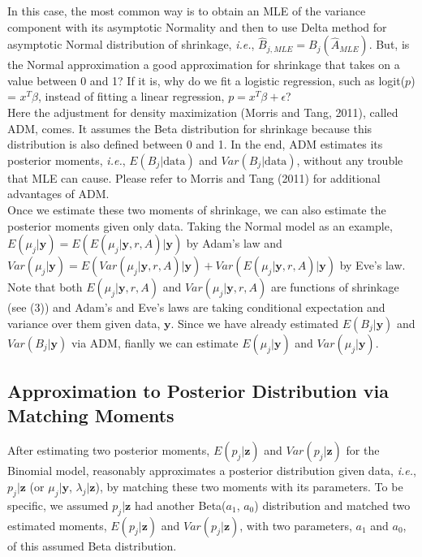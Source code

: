 \documentclass[article]{jss}
\begin{document}
In this case, the most common way is to obtain an MLE of the variance component with its asymptotic Normality and then to use Delta method for asymptotic Normal distribution of shrinkage, \emph{i.e.}, $\hat{B}_{j, MLE}=B_{j}(\hat{A}_{MLE})$. But, is the Normal approximation a good approximation for shrinkage that takes on a value between 0 and 1? If it is, why do we fit a logistic regression, such as logit($p$) = $x^{T}\beta$, instead of fitting a linear regression, $p = x^{T}\beta+\epsilon$?
\\

Here the adjustment for density maximization (Morris and Tang, 2011), called ADM, comes. It assumes the Beta distribution for shrinkage because this distribution is also defined between 0 and 1. In the end, ADM  estimates its posterior moments, \emph{i.e.}, $E(B_{j}\vert\textrm{data})$ and $Var(B_{j}\vert\textrm{data})$, without any trouble that MLE can cause. Please refer to Morris and Tang (2011) for additional advantages of ADM.
\\

Once we estimate these two moments of shrinkage, we can also estimate the posterior moments given only data. Taking the Normal model as an example,  $E(\mu_{j}\vert \textbf{y})=E(E(\mu_{j}\vert \textbf{y}, r, A)\vert \textbf{y})$ by Adam's law and $Var(\mu_{j}\vert \textbf{y})=E(Var(\mu_{j}\vert \textbf{y}, r, A)\vert \textbf{y})+Var(E(\mu_{j}\vert \textbf{y}, r, A)\vert \textbf{y})$ by Eve's law. Note that both $E(\mu_{j}\vert \textbf{y}, r, A)$ and $Var(\mu_{j}\vert \textbf{y}, r, A)$ are functions of shrinkage (see (3)) and Adam's and Eve's laws are taking conditional expectation and variance over them given data, $\textbf{y}$. Since we have already estimated $E(B_{j}\vert\textbf{y})$ and $Var(B_{j}\vert\textbf{y})$ via ADM, fianlly we can estimate $E(\mu_{j}\vert \textbf{y})$ and $Var(\mu_{j}\vert \textbf{y})$.

\subsection[Approximation to Posterior Distribution by Moment Matching]{Approximation to Posterior Distribution via Matching Moments}
After estimating two posterior moments, $E(p_{j}\vert \textbf{z})$ and $Var(p_{j}\vert \textbf{z})$ for the Binomial model,  reasonably approximates a posterior distribution given data, \emph{i.e.}, $p_{j}\vert \textbf{z}$ (or $\mu_{j}\vert \textbf{y}$, $\lambda_{j}\vert \textbf{z}$), by matching these two moments with its parameters. To be specific, we assumed $p_{j}\vert \textbf{z}$ had another Beta($a_{1}$, $a_{0}$) distribution and matched two estimated moments, $E(p_{j}\vert \textbf{z})$ and $Var(p_{j}\vert \textbf{z})$, with two parameters, $a_{1}$ and $a_{0}$, of this assumed Beta distribution. 
\end{document}
